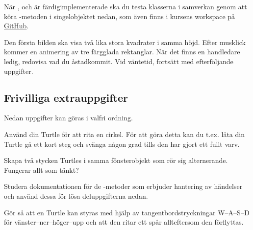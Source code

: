 \begin{figure}[H]
\end{figure}



\Task\Checkpoint När ,  och  är färdigimplementerade ska du testa klasserna i samverkan genom att köra -metoden i singelobjektet  nedan, som även finns i kursens workspace på \href{https://github.com/lunduniversity/introprog/blob/master/workspace/w05_turtle/src/main/scala/graphics/Rect.scala}{GitHub}.

Den första bilden ska visa två lika stora kvadrater i samma höjd. Efter musklick kommer en animering av tre färgglada rektanglar. När det finns en handledare ledig, redovisa vad du åstadkommit. Vid väntetid, fortsätt med efterföljande uppgifter.
\begin{figure}
\end{figure}




\clearpage

\subsection{Frivilliga extrauppgifter}

Nedan uppgifter kan göras i valfri ordning.

\Task Använd din Turtle för att rita en cirkel. För att göra detta kan du t.ex. låta din Turtle gå ett kort steg och svänga någon grad tills den har gjort ett fullt varv.

\Task Skapa två stycken Turtles i samma fönsterobjekt som rör sig alternerande. Fungerar allt som tänkt?


\Task Studera dokumentationen för de -metoder som erbjuder hantering av händelser  och använd dessa för lösa deluppgifterna nedan.

\Subtask Gör så att en Turtle kan styras med hjälp av tangentbordstryckningar W--A--S--D för vänster--ner--höger--upp och att den ritar ett spår allteftersom den förflyttas.

